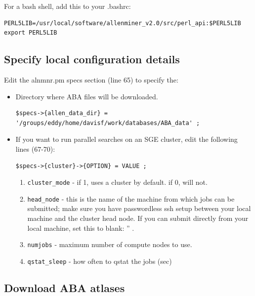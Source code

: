 \documentclass[10pt]{article}
\begin{document}
For a bash shell, add this to your .bashrc:
\begin{lstlisting}
PERL5LIB=/usr/local/software/allenminer_v2.0/src/perl_api:$PERL5LIB
export PERL5LIB
\end{lstlisting}

\subsection{Specify local configuration details}

Edit the alnmnr.pm specs section (line 65) to specify the:
\begin{itemize}
   \item Directory where ABA files will be downloaded.
\lstset{breaklines=true,language=bash,breakatwhitespace=true}
\lstset{frame=single}
\lstset{basicstyle=\ttfamily}
\begin{lstlisting}
$specs->{allen_data_dir} = '/groups/eddy/home/davisf/work/databases/ABA_data' ;
\end{lstlisting}

   \item If you want to run parallel searches on an SGE cluster, edit the following lines (67-70):
\lstset{breaklines=true,language=bash,breakatwhitespace=true}
\lstset{frame=single}
\lstset{basicstyle=\ttfamily}
\begin{lstlisting}
$specs->{cluster}->{OPTION} = VALUE ;
\end{lstlisting}

\begin{enumerate}
   \item {\tt cluster\_mode} - if 1, uses a cluster by default. if 0, will not.
   \item {\tt head\_node} - this is the name of the machine from which jobs can be submitted; make sure you have passwordless ssh setup between your local machine and the cluster head node. If you can submit directly from your local machine, set this to blank: '' .
   \item {\tt numjobs} - maximum number of compute nodes to use.
   \item {\tt qstat\_sleep} - how often to qstat the jobs (sec)
\end{enumerate}
\end{itemize}

\subsection{Download ABA atlases}
\end{document}

